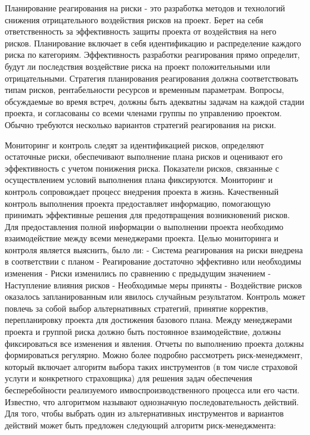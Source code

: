 Планирование реагирования на риски - это разработка методов и технологий
снижения отрицательного воздействия рисков на проект. Берет на себя ответственность за
эффективность защиты проекта от воздействия на него рисков. Планирование включает в
себя идентификацию и распределение каждого риска по категориям. Эффективность
разработки реагирования прямо определит, будут ли последствия воздействие риска на
проект положительными или отрицательными.
Стратегия планирования реагирования должна соответствовать типам рисков,
рентабельности ресурсов и временным параметрам. Вопросы, обсуждаемые во время
встреч, должны быть адекватны задачам на каждой стадии проекта, и согласованы со
всеми членами группы по управлению проектом. Обычно требуются несколько вариантов
стратегий реагирования на риски.

Мониторинг и контроль следят за идентификацией рисков, определяют
остаточные риски, обеспечивают выполнение плана рисков и оценивают его
эффективность с учетом понижения риска. Показатели рисков, связанные с
осуществлением условий выполнения плана фиксируются. Мониторинг и контроль
сопровождает процесс внедрения проекта в жизнь.
Качественный контроль выполнения проекта предоставляет информацию,
помогающую принимать эффективные решения для предотвращения возникновений
рисков. Для предоставления полной информации о выполнении проекта необходимо
взаимодействие между всеми менеджерами проекта.
Целью мониторинга и контроля является выяснить, было ли:
- Система реагирования на риски внедрена в соответствии с планом
- Реагирование достаточно эффективно или необходимы изменения
- Риски изменились по сравнению с предыдущим значением
- Наступление влияния рисков
- Необходимые меры приняты
- Воздействие рисков оказалось запланированным или явилось случайным
результатом.
Контроль может повлечь за собой выбор альтернативных стратегий, принятие
корректив, перепланировку проекта для достижения базового плана. Между менеджерами
проекта и группой риска должно быть постоянное взаимодействие, должны
фиксироваться все изменения и явления. Отчеты по выполнению проекта должны
формироваться регулярно.
Можно более подробно рассмотреть риск-менеджмент, который включает
алгоритм выбора таких инструментов (в том числе страховой услуги и конкретного
страховщика) для решения задач обеспечения бесперебойности реализуемого имвоспроизводственного процесса или его части. Известно, что алгоритмом называют
однозначную последовательность действий.
Для того, чтобы выбрать один из альтернативных инструментов и вариантов
действий может быть предложен следующий алгоритм риск-менеджмента:
